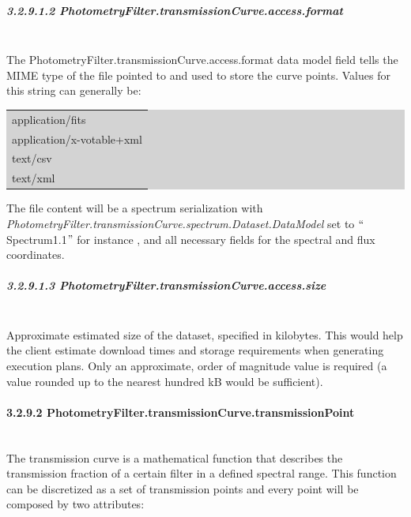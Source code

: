\documentclass[11pt,a4paper]{ivoa}
\begin{document}
\subparagraph{3.2.9.1.2 PhotometryFilter.transmissionCurve.access.format} \hspace{0pt} \\
The PhotometryFilter.transmissionCurve.access.format data model field tells the MIME type of the file pointed to and used to store the curve points. Values for this string can generally be:\par

\bigskip
\par
\begingroup\setlength{\fboxsep}{0pt}
\colorbox{lightgray}{%
\begin{tabular}{|p{5.53in}|}
application/fits \\
application/x-votable+xml \\
text/csv \\
text/xml
\end{tabular}%
}\endgroup
\par
\bigskip



The file content will be a spectrum serialization with \textit{PhotometryFilter.transmissionCurve.spectrum.Dataset.DataModel }set to $``$Spectrum1.1$"$  for instance , and all necessary fields for the spectral and flux coordinates.
\par

\subparagraph{3.2.9.1.3 PhotometryFilter.transmissionCurve.access.size} \hspace{0pt} \\
Approximate estimated size of the dataset, specified in kilobytes. This would help the client estimate download times and storage requirements when generating execution plans. Only an approximate, order of magnitude value is required (a value rounded up to the nearest hundred kB would be sufficient).\par

\paragraph{3.2.9.2 PhotometryFilter.transmissionCurve.transmissionPoint} \hspace{0pt} \\
The transmission curve is a mathematical function that describes the transmission fraction of a certain filter in a defined spectral range. This function can be discretized as a set of transmission points and every point will be composed by two attributes:
\par
\end{document}

